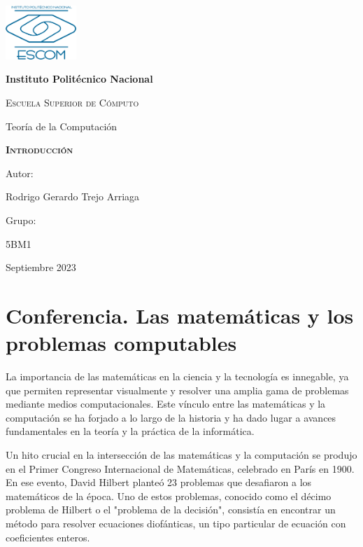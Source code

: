 \documentclass[12pt]{article} %
\begin{document}
	
	\begin{titlepage}
		\centering
		{\includegraphics[width=0.2\textwidth]{escom}\par}
		\vspace{0.5cm}
		{\bfseries\huge Instituto Politécnico Nacional \par}
		\vspace{0.2cm}
		{\scshape\LARGE Escuela Superior de Cómputo \par}
		\vspace{0.7cm}
		{\LARGE Teoría de la Computación \par}
		\vspace{3cm}
		{\scshape \Huge \textbf{Introducción}  \par}
		\vspace{2.5cm}
		{\Large Autor: \par}
		{\Large Rodrigo Gerardo Trejo Arriaga \par}
		
		\vspace{0.5cm}
		{\Large Grupo: \par}
		{\Large 5BM1 \par}
		\vspace{2.5cm}
		{\Large Septiembre 2023 \par}
	\end{titlepage}
	
	
	\section{Conferencia. Las matemáticas y los problemas computables}
	
	La importancia de las matemáticas en la ciencia y la tecnología es innegable, ya que permiten representar visualmente y resolver una amplia gama de problemas mediante medios computacionales. Este vínculo entre las matemáticas y la computación se ha forjado a lo largo de la historia y ha dado lugar a avances fundamentales en la teoría y la práctica de la informática.
	
	Un hito crucial en la intersección de las matemáticas y la computación se produjo en el Primer Congreso Internacional de Matemáticas, celebrado en París en 1900. En ese evento, David Hilbert planteó 23 problemas que desafiaron a los matemáticos de la época. Uno de estos problemas, conocido como el décimo problema de Hilbert o el "problema de la decisión", consistía en encontrar un método para resolver ecuaciones diofánticas, un tipo particular de ecuación con coeficientes enteros.
	
\end{document}
